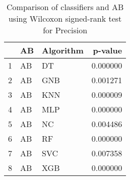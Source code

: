 \begin{table}
\footnotesize
\caption{Comparison of classifiers and AB using Wilcoxon signed-rank test for Precision}
\label{tab:AB wilcoxon Precision comparison}
\begin{tabular}{lllr}
\hline
 & AB & Algorithm & p-value \\
\hline
1 & AB & DT & 0.000000 \\
2 & AB & GNB & 0.001271 \\
3 & AB & KNN & 0.000009 \\
4 & AB & MLP & 0.000000 \\
5 & AB & NC & 0.004486 \\
6 & AB & RF & 0.000000 \\
7 & AB & SVC & 0.007358 \\
8 & AB & XGB & 0.000000 \\
\hline
\end{tabular}
\end{table}
